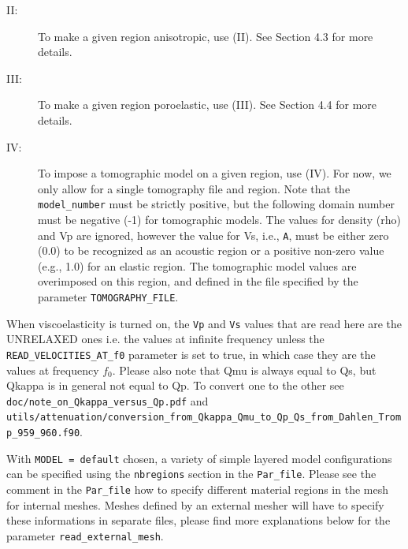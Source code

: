 \begin{description}
\begin{description}
\item[II:] To make a given region anisotropic, use (II).  See Section 4.3 for more details.

\item[III:] To make a given region poroelastic, use (III).  See Section 4.4 for more details.

\item[IV:] To impose a tomographic model on a given region, use (IV).  For now, we only allow for a single tomography file and region.
Note that the \texttt{model\_number} must be strictly positive, but the following domain number must be negative (-1) for tomographic models.
The values for density (rho) and Vp are ignored, however the value for Vs, i.e., \texttt{A}, must be either zero (0.0) to be recognized as an acoustic region or a positive non-zero value (e.g., 1.0) for an elastic region. The tomographic model values are overimposed on this region, and defined in the file specified by the parameter \texttt{TOMOGRAPHY\_FILE}.
\end{description}

When viscoelasticity is turned on, the \texttt{Vp} and \texttt{Vs} values that are read here are the UNRELAXED ones i.e. the values at infinite frequency
unless the \texttt{READ\_VELOCITIES\_AT\_f0} parameter is set to true, in which case they are the values at frequency $f_0$.
Please also note that Qmu is always equal to Qs, but Qkappa is in general not equal to Qp. To convert one to the other see \texttt{doc/note\_on\_Qkappa\_versus\_Qp.pdf} and \texttt{utils/attenuation/conversion\_from\_Qkappa\_Qmu\_to\_Qp\_Qs\_from\_Dahlen\_Tromp\_959\_960.f90}.

 With \texttt{MODEL = default} chosen, a variety of simple layered model configurations can be specified using the \texttt{nbregions} section in the \texttt{Par\_file}. Please see the comment in the \texttt{Par\_file} how to specify different material regions in the mesh for internal meshes. Meshes defined by an external mesher will have to specify these informations in separate files, please find more explanations below for the parameter \texttt{read\_external\_mesh}.


\end{description}
